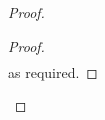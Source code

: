 \begin{lemma}
\begin{proof}
{\begin{lemma}[]
\begin{proof}
\begin{align*}
\end{align*}
%
as required.
\end{proof}
\end{lemma}
%
%
}
\end{proof}
\end{lemma}
